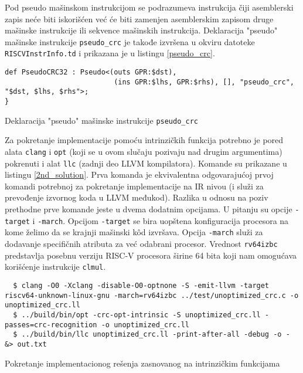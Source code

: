 \documentclass[12pt,oneside]{memoir}
\begin{document}
Pod pseudo mašinskom instrukcijom se podrazumeva instrukcija čiji asemblerski zapis neće biti iskorišćen već će biti zamenjen asemblerskim zapisom druge mašinske instrukcije ili sekvence mašinskih instrukcija. Deklaracija "pseudo" mašinske instrukcije \texttt{pseudo\_crc} je takođe izvršena u okviru datoteke \texttt{RISCVInstrInfo.td} i prikazana je u listingu \ref{pseudo_crc}. 

\begin{listing}[!ht]
\begin{verbatim}
def PseudoCRC32 : Pseudo<(outs GPR:$dst),
                          (ins GPR:$lhs, GPR:$rhs), [], "pseudo_crc", "$dst, $lhs, $rhs">;
}
\end{verbatim}
\caption{Deklaracija "pseudo" mašinske instrukcije \texttt{pseudo\_crc}}
\label{pseudo_crc}
\centering
\end{listing}

Za pokretanje implementacije pomoću intrinzičkih funkcija potrebno je pored alata \texttt{clang} i \texttt{opt} (koji se u ovom slučaju pozivaju nad drugim argumentima) pokrenuti i alat \texttt{llc} (zadnji deo LLVM kompilatora). Komande su prikazane u listingu \ref{2nd_solution}. Prva komanda je ekvivalentna odgovarajućoj prvoj komandi potrebnoj za pokretanje implementacije na IR nivou (i služi za prevođenje izvornog koda u LLVM međukod). Razlika u odnosu na poziv prethodne prve komande jeste u dvema dodatnim opcijama. U pitanju su opcije \texttt{-target} i \texttt{-march}. Opcijom \texttt{-target} se bira uopštena konfiguracija procesora na kome želimo da se krajnji mašinski k\^od izvršava. Opcija \texttt{-march} služi za dodavanje specifičnih atributa za već odabrani procesor. Vrednost \texttt{rv64izbc} predstavlja posebnu verziju RISC-V procesora širine 64 bita koji nam omogućava korišćenje instrukcije \texttt{clmul}.

\begin{listing}[!ht]
\begin{verbatim}
  $ clang -O0 -Xclang -disable-O0-optnone -S -emit-llvm -target riscv64-unknown-linux-gnu -march=rv64izbc ../test/unoptimized_crc.c -o unoptimized_crc.ll
  $ ../build/bin/opt -crc-opt-intrinsic -S unoptimized_crc.ll -passes=crc-recognition -o unoptimized_crc.ll
  $ ../build/bin/llc unoptimized_crc.ll -print-after-all -debug -o - &> out.txt
\end{verbatim}
\caption{Pokretanje implementacionog rešenja zasnovanog na intrinzičkim funkcijama}
\label{2nd_solution}
\centering
\end{listing}
\end{document}
